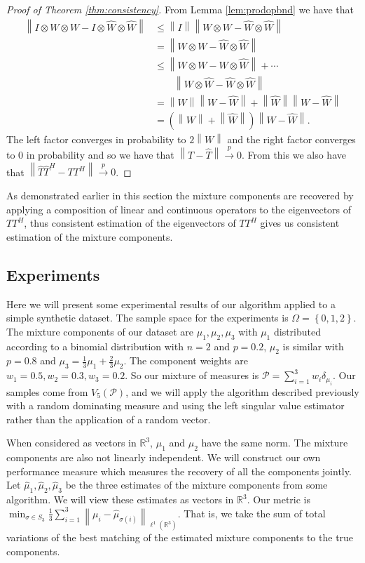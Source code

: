 \documentclass[aos,preprint]{imsart}
\def\rn{\mathbb{R}}
\def\l{\left}
\def\r{\right}
\def\sP{\mathscr{P}}
\def\cip{\overset{p}{\rightarrow}}
\theoremstyle{plain}
\theoremstyle{defintion}
\begin{document}
\begin{proof}[Proof of Theorem \ref{thm:consistency}]
	From Lemma \ref{lem:prodopbnd} we have that 
	\begin{align*}
		\l\|  I \otimes W \otimes W -  I \otimes \widehat{W} \otimes \widehat{W}  \r\| 
		&\le \l\|I \r\| \l\|   W \otimes W -   \widehat{W} \otimes \widehat{W}  \r\| \\
		&= \l\|   W \otimes W -   \widehat{W} \otimes \widehat{W}  \r\|\\
		&\le \l\|   W \otimes W - W \otimes \widehat{W}\r\|+\cdots\\
		&\qquad \l\|W \otimes \widehat{W} -  \widehat{W} \otimes \widehat{W}  \r\|\\
		&= \l\|W\r\| \l\| W - \widehat{W}\r\| +\l\|\widehat{W} \r\| \l\|W  -  \widehat{W}   \r\|\\
		&= \l(\l\|W\r\| + \l\|\widehat{W} \r\| \r)\l\| W - \widehat{W}\r\|.
	\end{align*}
	The left factor converges in probability to $2\l\|W\r\|$ and the right factor converges to 0 in probability and so we have that $\l\|T - \widehat{T}\r\| \cip 0 $. From this we also have that $\l\| \widehat{T}\widehat{T}^H - TT^H\r\| \cip 0$. 
\end{proof}

As demonstrated earlier in this section the mixture components are recovered by applying a composition of linear and continuous operators to the eigenvectors of $TT^H$, thus consistent estimation of the eigenvectors of $TT^H$ gives us consistent estimation of the mixture components.

	\subsection{Experiments}
	Here we will present some experimental results of our algorithm applied to a simple synthetic dataset. The sample space for the experiments is $\Omega = \left\{ 0,1,2 \right\}$. The mixture components of our dataset are $\mu_1,\mu_2,\mu_3$ with $\mu_1$ distributed according to a binomial distribution with $n=2$ and $p = 0.2$, $\mu_2$ is similar with $p=0.8$ and $\mu_3 = \frac{1}{3} \mu_1 + \frac{2}{3}\mu_2$. The component weights are $w_1 = 0.5, w_2 = 0.3, w_3 = 0.2$. So our mixture of measures is $\sP = \sum_{i=1}^3 w_i \delta_{\mu_i}$. Our samples come from $V_5\left( \sP \right)$, and we will apply the algorithm described previously with a random dominating measure and using the left singular value estimator rather than the application of a random vector.

	When considered as vectors in $\rn^3$, $\mu_1$ and $\mu_2$ have the same norm. The mixture components are also not linearly independent.
	We will construct our own performance measure which measures the recovery of all the components jointly. Let $\widehat{\mu}_1, \widehat{\mu}_2,\widehat{\mu}_3$ be the three estimates of the mixture components from some algorithm. We will view these estimates as vectors in $\rn^3$. Our metric is $\min_{\sigma \in S_3} \frac{1}{3}\sum_{i=1}^3 \l\|\mu_i - \widehat{\mu}_{\sigma\left( i \right)}\r\|_{\ell^1\left( \rn^3 \right)}$. That is, we take the sum of total variations of the best matching of the estimated mixture components to the true components.
\end{document}
